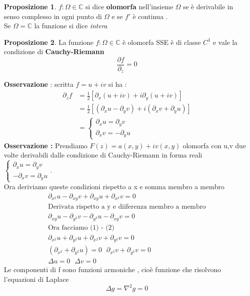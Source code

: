 \documentclass{article}
\theoremstyle{definition}
\newtheorem*{proposizione}{Proposizione}
\newcommand{\C}{\mathbb{C}}
\begin{document}
	\begin{proposizione}
		$f:\Omega \in \C$ si dice \textbf{olomorfa} nell'insieme $\Omega$ se è derivabile in senso complesso in ogni punto di $\Omega$ e se $f'$ è continua . \\
		Se $\Omega =\C$ la funzione si dice \textit{intera}
	\end{proposizione}
	\begin{proposizione}
	La funzione 	$f:\Omega \in \C$  è olomorfa SSE è di classe $C^1$ e vale la condizione di \textbf{Cauchy-Riemann} 
	$$\frac{\partial f}{\partial_{\overline{z}}}=0$$
		\end{proposizione}
	\textbf{Osservazione} : scritta $f=u+iv$ si ha : 
	\begin{align*}
		\partial_{\overline{z}}f&=\frac{1}{2}[\partial_x(u+iv)+i\partial_y(u+iv)] \\
		&= \frac{1}{2} \left[(\partial_xu-\partial_yv)+i(\partial_xv+\partial_yu)\right] \\
		&=\begin{cases}
			\partial_xu=\partial_yv\\
			\partial_xv=-\partial_yu
		\end{cases}
	\end{align*}
	\textbf{Osservazione : } Prendiamo $F(z)=a(x,y)+iv(x,y)$ olomorfa con u,v due volte derivabili dalle condizione di Cauchy-Riemann in forma reali  $\begin{cases}
		\partial_xu=\partial_yv\\
		-\partial_xv=\partial_yu
	\end{cases}$. \\
	Ora deriviamo queste condizioni rispetto a x e somma membro a membro 
	\begin{align*}
\partial_{x^2}u-\partial_{xy}v+\partial_{xy}u+\partial_{x^2}v=0 \\
\text{Derivata rispetto a y e diiferenza membro a membro} \\
\partial_{xy}u-\partial_{y^2}v-\partial_{y^2}u-\partial_{xy}v=0 \\
\text{Ora facciamo (1) - (2)}\\
\partial_{x^2}u+\partial_{y^2}u+\partial_{x^2}v+\partial_{y^2}v=0 \\
(\partial_{x^2}+\partial_{y^2}u)=0 \ \ \ \partial_{x^2}v+\partial_{y^2}v=0 \\
\Delta u=0 \ \ \ \Delta v=0
	\end{align*}
	Le componenti di f sono funzioni armoniche , cioè funzione che risolvono l'equazioni di Laplace $$\Delta g=\nabla^2 g =0$$
\end{document}
